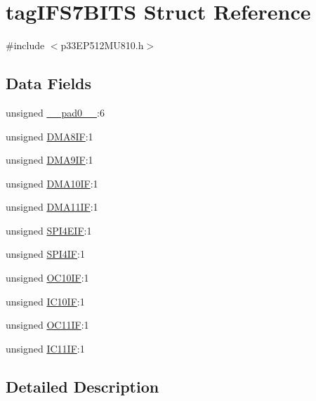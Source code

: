 \hypertarget{structtag_i_f_s7_b_i_t_s}{}\section{tag\+I\+F\+S7\+B\+I\+TS Struct Reference}
\label{structtag_i_f_s7_b_i_t_s}


{\ttfamily \#include $<$p33\+E\+P512\+M\+U810.\+h$>$}

\subsection*{Data Fields}
\begin{DoxyCompactItemize}
\item 
unsigned \hyperlink{structtag_i_f_s7_b_i_t_s_adf71f3d8410c1f1dbbc96680a92c49af}{\+\_\+\+\_\+pad0\+\_\+\+\_\+}\+:6
\item 
unsigned \hyperlink{structtag_i_f_s7_b_i_t_s_a6b4d04eb3f5cfedb74659cbc25d4b908}{D\+M\+A8\+IF}\+:1
\item 
unsigned \hyperlink{structtag_i_f_s7_b_i_t_s_aca8fbf239610a8d197b5e0877c94ae41}{D\+M\+A9\+IF}\+:1
\item 
unsigned \hyperlink{structtag_i_f_s7_b_i_t_s_ae3da81ed8d3d5879b6e0dd27d4ac8189}{D\+M\+A10\+IF}\+:1
\item 
unsigned \hyperlink{structtag_i_f_s7_b_i_t_s_aa15655715f15ea97d120fba130b3b59e}{D\+M\+A11\+IF}\+:1
\item 
unsigned \hyperlink{structtag_i_f_s7_b_i_t_s_abf3d89e381504e406410aac7c5d0c9f0}{S\+P\+I4\+E\+IF}\+:1
\item 
unsigned \hyperlink{structtag_i_f_s7_b_i_t_s_a5c32739c7336df804fa9a1506c8d5bc7}{S\+P\+I4\+IF}\+:1
\item 
unsigned \hyperlink{structtag_i_f_s7_b_i_t_s_a3ef3b8f1d89eb8a27d3fabc56195bdce}{O\+C10\+IF}\+:1
\item 
unsigned \hyperlink{structtag_i_f_s7_b_i_t_s_a210ea812cfcbebcae6f5ea9f82afa4c3}{I\+C10\+IF}\+:1
\item 
unsigned \hyperlink{structtag_i_f_s7_b_i_t_s_a0fb9d681172afd468f75d57457d5456b}{O\+C11\+IF}\+:1
\item 
unsigned \hyperlink{structtag_i_f_s7_b_i_t_s_a7ec6259c635968766b8a0b3cb3552c1c}{I\+C11\+IF}\+:1
\end{DoxyCompactItemize}


\subsection{Detailed Description}


